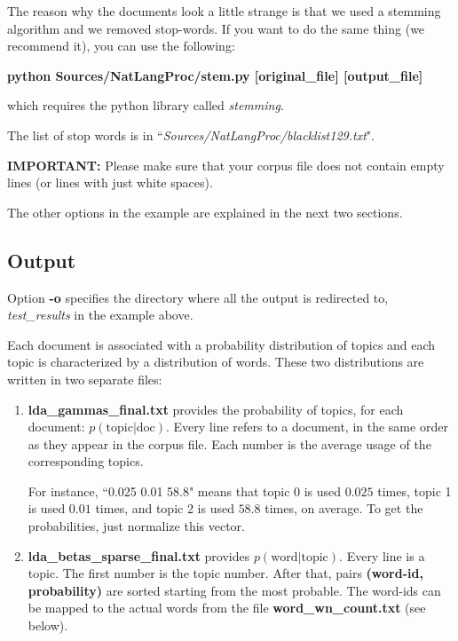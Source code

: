 \documentclass[11pt]{article}
\begin{document}
The reason why the documents look a little strange is that we used a stemming algorithm and we removed stop-words. If you want to do the same thing (we recommend it),  you can use the following:

\textbf{python Sources/NatLangProc/stem.py [original\_file] [output\_file]}

which requires the python library called \textit{stemming}.

The list of stop words is in ``\textit{Sources/NatLangProc/blacklist129.txt}".

\textbf{IMPORTANT:} Please make sure that your corpus file does not contain empty lines (or lines with just white spaces). 

The other options in the example are explained in the next two sections.

\subsection{Output}

Option \textbf{-o} specifies the directory where all the output is redirected to, \textit{test\_results} in the example above.


Each document is associated with a probability distribution of topics and 
each topic is characterized by a  distribution of words. These two distributions are written in two separate files:

\begin{enumerate}
  \item \textbf{lda\_gammas\_final.txt} provides the probability of topics, for each document: $p(\textrm{topic}|\textrm{doc})$. Every line refers to a document, in the same order as they appear in the corpus file. Each number is the average usage of the corresponding topics.
 
 For instance, ``0.025 0.01 58.8" means that topic 0 is used $0.025$ times, topic 1 is used $0.01$ times, and topic 2 is used $58.8$ times, on average.
 To get the probabilities, just normalize this vector.

  \item  \textbf{lda\_betas\_sparse\_final.txt} provides $p(\textrm{word}|\textrm{topic})$. Every line is a topic. The first number is the topic number. After that,  pairs \textbf{(word-id, probability)} are sorted starting from the most probable. The word-ids can be mapped to the actual words from the file \textbf{word\_wn\_count.txt} (see below).
\end{enumerate}
\end{document}
